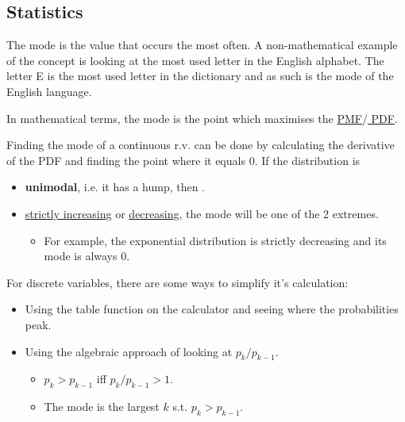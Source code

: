 \documentclass[english]{article}
\begin{document}
\begin{multicols*}{2}

\section{Statistics}
\begin{definitionNOHFILL}[Mode]
\begin{rappel_enhanced}[Context]
The mode is the value that occurs the most often. A non-mathematical example of the concept is looking at the most used letter in the English alphabet. The letter E is the most used letter in the dictionary and as such is the mode of the English language.
\end{rappel_enhanced}

In mathematical terms, the mode is the point which maximises the \hyperlink{0pmf}{\color{bleudefrance} PMF}/\hyperlink{0pdf}{\color{bleudefrance} PDF}.

\bigskip

Finding the mode of a continuous r.v. can be done by calculating the derivative of the PDF and finding the point where it equals $0$.  If the distribution is
\begin{itemize}
	\item	\textbf{unimodal}, i.e. it has a hump, then .
	\item	\underline{strictly increasing} or \underline{decreasing}, the mode will be one of the 2 extremes.
		\begin{itemize}
		\item	For example, the exponential distribution is strictly decreasing and its mode is always $0$.
		\end{itemize}
\end{itemize}

\bigskip

For discrete variables, there are some ways to simplify it's calculation:
\begin{itemize}
	\item	Using the table function on the calculator and seeing where the probabilities peak.
	\item	Using the algebraic approach of looking at $p_{k} / p_{k - 1}$.
		\begin{itemize}
		\item	$p_{k} > p_{k - 1}$ iff $p_{k}/p_{k - 1} > 1$.
		\item	The mode is the largest $k$ s.t. $p_{k} > p_{k - 1}$.
		\end{itemize}
\end{itemize}


\end{definitionNOHFILL}
\end{multicols*}
\end{document}
